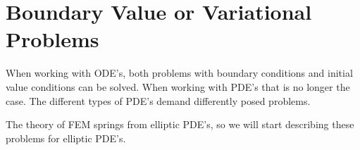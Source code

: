 \section{Boundary Value or Variational Problems}
When working with ODE's, both problems with boundary conditions 
and initial value conditions can be solved. When working with 
PDE's that is no longer the case. The different types 
of PDE's demand differently posed problems. 

The theory of FEM springs from elliptic PDE's, so we will start 
describing these problems for elliptic PDE's.